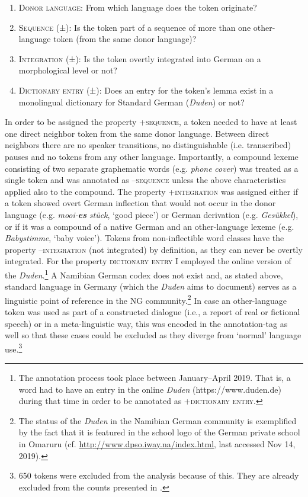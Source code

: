 \documentclass[output=paper]{langsci/langscibook}
\begin{document}
\begin{enumerate}
	\item \textsc{Donor} \textsc{language:} From which language does the token originate?
   
	\item \textsc{Sequence} \textsc{(±):} Is the token part of a sequence of more than one other-language token (from the same donor language)?
    
	\item \textsc{Integration} \textsc{(±):} Is the token overtly integrated into German on a morphological level or not?
      
	\item \textsc{Dictionary} \textsc{entry} \textsc{(±):} Does an entry for the token’s lemma exist in a monolingual dictionary for Standard German (\textit{Duden}) or not?
\end{enumerate}
    
In order to be assigned the property \textsc{+sequence,} a token needed to have at least one direct neighbor token from the same donor language. Between direct neighbors there are no speaker transitions, no distinguishable (i.e. transcribed) pauses and no tokens from any other language. Importantly, a compound lexeme consisting of two separate graphematic words (e.g. \textit{phone} \textit{cover}) was treated as a single token and was annotated as –\textsc{sequence} unless the above characteristics applied also to the compound. The property \textsc{+integration} was assigned either if a token showed overt German inflection that would not occur in the donor language (e.g. \textit{mooi-}\textbf{\textit{es}} \textit{stück}, ‘good piece’) or German derivation (e.g. \textit{Gesükkel}), or if it was a compound of a native German and an other-language lexeme (e.g. \textit{Babystimme}, ‘baby voice’). Tokens from non-inflectible word classes have the property –\textsc{integration} (not integrated) by definition, as they can never be overtly integrated. For the property \textsc{dictionary} \textsc{entry} I employed the online version of the \textit{Duden}.\footnote{The annotation process took place between January--April 2019. That is, a word had to have an entry in the online \textit{Duden} (https://www.duden.de) during that time in order to be annotated as +\textsc{dictionary} \textsc{entry}.} A Namibian German codex does not exist and, as stated above, standard language in Germany (which the \textit{Duden} aims to document) serves as a linguistic point of reference in the NG community.\footnote{The status of the \textit{Duden} in the Namibian German community is exemplified by the fact that it is featured in the school logo of the German private school in Omaruru (cf. \url{http://www.dpso.iway.na/index.html}, last accessed Nov 14, 2019).} In case an other-language token was used as part of a constructed dialogue (i.e., a report of real or fictional speech) or in a meta-linguistic way, this was encoded in the annotation-tag as well so that these cases could be excluded as they diverge from ‘normal’ language use.\footnote{650 tokens were excluded from the analysis because of this. They are already excluded from the counts presented in .}
\end{document}
